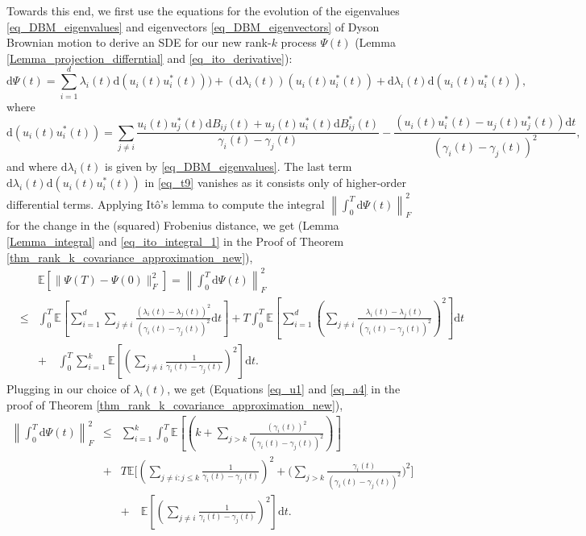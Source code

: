 \documentclass[11pt,letterpaper]{article}
\begin{document}
Towards this end, we first use the equations for the evolution of the eigenvalues \eqref{eq_DBM_eigenvalues} and eigenvectors \eqref{eq_DBM_eigenvectors} of Dyson Brownian motion to derive an SDE for our new rank-$k$ process $\Psi(t)$ (Lemma \ref{Lemma_projection_differntial} and \eqref{eq_ito_derivative}):
%
\begin{equation}\label{eq_t9}
  \mathrm{d}\Psi(t)  = \sum_{i=1}^d \lambda_i(t) \mathrm{d}(u_i(t) u_i^\ast(t))) + (\mathrm{d}\lambda_i(t)) (u_i(t) u_i^\ast(t)) + \mathrm{d}\lambda_i(t) \mathrm{d}( u_i(t) u_i^\ast(t)),
%
\end{equation}
%
where  
%
$$  \mathrm{d}(u_i(t) u_i^\ast(t))
     =  \sum_{j \neq i} \frac{u_i(t) u_j^\ast(t)\mathrm{d}B_{ij}(t)  + u_j(t) u_i^\ast(t)\mathrm{d}B_{ij}^\ast(t)}{\gamma_i(t) - \gamma_j(t)}
    - \frac{(u_i(t) u_i^\ast(t) - u_j(t)u_j^\ast(t))\mathrm{d}t}{(\gamma_i(t)- \gamma_j(t))^2},$$ and where $\mathrm{d}\lambda_i(t)$ is given by \eqref{eq_DBM_eigenvalues}.
    The last term  $\mathrm{d}\lambda_i(t) \mathrm{d}( u_i(t) u_i^\ast(t))$ in \eqref{eq_t9} vanishes as it consists only of higher-order differential terms.
%
%
Applying It\^o's lemma to compute the integral $\left\|\int_0^T \mathrm{d} \Psi(t)\right\|_F^2$ for the change in the (squared) Frobenius  distance, we get (Lemma \ref{Lemma_integral} and \eqref{eq_ito_integral_1} in the Proof of Theorem \ref{thm_rank_k_covariance_approximation_new}),
%
\begin{eqnarray}
& & \!\!\!\!\!\!\!\!\!\!\!\!\!\!\!\!\!\!\!\!\!\!\!\!\!\!\!\!\!\!\!\!\!\!\!\! \mathbb{E}[\| \Psi(T) - \Psi(0)\|_F^2] = \left\|\int_0^T \mathrm{d} \Psi(t)\right\|_F^2 \nonumber \\
%
& \leq & \int_{0}^{T}   \mathbb{E}\left[ \sum_{i=1}^{d}  \sum_{j \neq i}  \frac{(\lambda_i(t) - \lambda_j(t))^2}{(\gamma_i(t) - \gamma_j(t))^2} \mathrm{d}t \right] +   T \int_{0}^{T}\mathbb{E}\left[\sum_{i=1}^{d}\left(\sum_{j\neq i} \frac{\lambda_i(t) - \lambda_j(t)}{(\gamma_i(t) - \gamma_j(t))^2}\right)^2   \right]\mathrm{d}t \nonumber\\ 
%
%
& & + \quad \int_{0}^T \sum_{i=1}^k\mathbb{E}\left[  \left(\sum_{j \neq i} \frac{1}{\gamma_i(t) - \gamma_j(t)}\right)^2 \right] \mathrm{d}t.  
     \end{eqnarray}
%
Plugging in our choice of $\lambda_i(t)$, we get (Equations \eqref{eq_u1} and \eqref{eq_a4} in the proof of Theorem \ref{thm_rank_k_covariance_approximation_new}),
%
\begin{eqnarray}\label{eq_t9_2}
 \left\|\int_0^T \mathrm{d} \Psi(t)\right\|_F^2 &\leq &  \sum_{i=1}^{k}\int_{0}^{T}   \mathbb{E}\left[ \left( k +  \sum_{j >k}  \frac{(\gamma_i(t))^2}{(\gamma_i(t)- \gamma_j(t))^2} \right)\right]\nonumber \\
     &+&    T \mathbb{E}\bigg[\left(\sum_{j \neq i: j\leq k} \frac{1}{\gamma_i(t)- \gamma_j(t)}\right)^2   + \bigg(\sum_{j> k} \frac{\gamma_i(t)}{(\gamma_i(t)- \gamma_j(t))^2}\bigg)^2 \bigg] \nonumber \\
   & &  + \quad \mathbb{E}\left[  \left(\sum_{j \neq i} \frac{1}{\gamma_i(t) - \gamma_j(t)}\right)^2 \right] \mathrm{d}t.
    \end{eqnarray}
\end{document}
